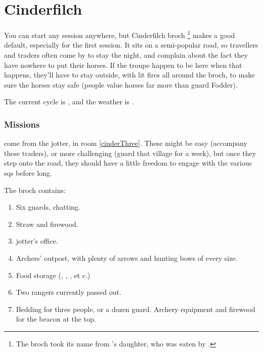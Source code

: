 \section{Cinderfilch }
\label{cinderfilch}



\begin{multicols}{2}

\noindent
You can start any session anywhere, but Cinderfilch \gls{broch}%
\footnote{The \gls{broch} took its name from 's daughter, who was eaten by .}
makes a good default, especially for the first session.
It sits on a semi-popular road, so travellers and traders often come by to stay the night, and complain about the fact they have nowhere to put their horses.
If the troupe happen to be here when that happens, they'll have to stay outside, with lit fires all around the \gls{broch}, to make sure the horses stay safe (people value horses far more than \gls{guard} Fodder).

The current \gls{cycle} is \showCycle, and the weather is \showTemperature.

\subsubsection{Missions}
come from the \gls{jotter}, in room \ref{cinderThree}.%
These might be easy (accompany these traders), or more challenging (guard that \gls{village} for a week), but once they step onto the road, they should have a little freedom to engage with the various \glspl{sq} before long.

The \gls{broch} contains:

\begin{enumerate}
  \item
  Six \glspl{guard}, chatting.
  \label{cinderOne}
  \item
  Straw and firewood.
  \label{cinderTwo}
  \item
  \Gls{jotter}'s office.
  \label{cinderThree}
  \item
  Archers' outpost, with plenty of arrows and hunting bows of every size.
  \label{cinderFour}
  \item
  Food storage (\rations, \rations, \rations, et c.)
  \label{cinderFiveSide}
  \item
  Two \glspl{ranger} currently passed out.
  \label{cinderFive}
  \item
  Bedding for three people, or a dozen \gls{guard}.
  Archery equipment and firewood for the beacon at the top.
  \label{cinderSix}
\end{enumerate}

\end{multicols}
